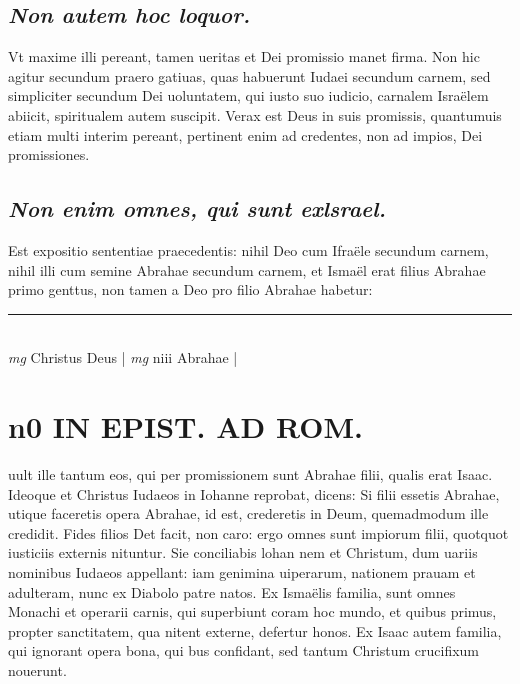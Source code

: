 \documentclass{article}
\begin{document}
\begin{pages}
\subsection*{\textit{Non autem hoc loquor. }}\pstart Vt maxime illi pereant, tamen ueritas et Dei promissio manet firma. Non hic agitur secundum praero gatiuas, quas habuerunt Iudaei secundum carnem, sed simpliciter secundum Dei uoluntatem, qui iusto suo iudicio, carnalem Israëlem abiicit, spiritualem autem suscipit. Verax est Deus in suis promissis, quantumuis etiam multi interim pereant, pertinent enim ad credentes, non ad impios, Dei promissiones.   \pend
{}
{}
\subsection*{\textit{Non enim omnes, qui sunt exlsrael. }}\pstart Est expositio sententiae praecedentis: nihil Deo cum Ifraële secundum carnem, nihil illi cum semine Abrahae secundum carnem, et Ismaël erat filius Abrahae primo genttus, non tamen a Deo pro filio Abrahae habetur:  \pend
\vspace{0.5cm}\noindent
\vspace{0.2cm}\rule{1cm}{0.2pt}\\ 
\hspace{0.2cm}\textit{mg}
\footnotesize Christus Deus
\normalsize| 
\hspace{0.2cm}\textit{mg}
\footnotesize niii Abrahae 
\normalsize| 
\section*{n0 IN EPIST. AD ROM.  }
\marginpar{[ p.]}\pstart uult ille tantum eos, qui per promissionem sunt Abrahae filii, qualis erat Isaac. Ideoque et Christus Iudaeos in Iohanne reprobat, dicens: Si filii essetis Abrahae, utique faceretis opera Abrahae, id est, crederetis in Deum, quemadmodum ille credidit. Fides filios Det facit, non caro: ergo omnes sunt impiorum filii, quotquot iusticiis externis nituntur. Sie conciliabis lohan nem et Christum, dum uariis nominibus Iudaeos appellant: iam genimina uiperarum, nationem prauam et adulteram, nunc ex Diabolo patre natos. Ex Ismaëlis familia, sunt omnes Monachi et operarii carnis, qui superbiunt coram hoc mundo, et quibus primus, propter sanctitatem, qua nitent externe, defertur honos.  Ex Isaac autem familia, qui ignorant opera bona, qui bus confidant, sed tantum Christum crucifixum nouerunt.  \pend
{}
{}

\end{pages}
\end{document}
